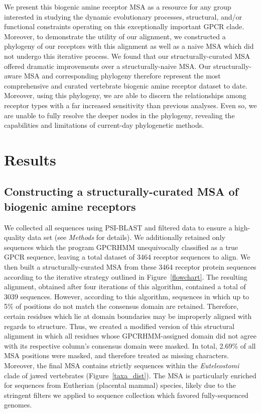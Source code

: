 \documentclass[fleqn,10pt]{wlpeerj}
\begin{document}
We present this biogenic amine receptor MSA as a resource for any group interested in studying the dynamic evolutionary processes, structural, and/or functional constraints operating on this exceptionally important GPCR clade. Moreover, to demonstrate the utility of our alignment, we constructed a phylogeny of our receptors with this alignment as well as a naive MSA which did not undergo this iterative process. We found that our structurally-curated MSA offered dramatic improvements over a structurally-naive MSA. Our structurally-aware MSA and corresponding phylogeny therefore represent the most comprehensive and curated vertebrate biogenic amine receptor dataset to date. Moreover, using this phylogeny, we are able to discern the relationships among receptor types with a far increased sensitivity than previous analyses. Even so, we are unable to fully resolve the deeper nodes in the phylogeny, revealing the capabilities and limitations of current-day phylogenetic methods.

\section*{Results}

\subsection*{Constructing a structurally-curated MSA of biogenic amine receptors}
We collected all sequences using PSI-BLAST and filtered data to ensure a high-quality data set (see \emph{Methods} for details). We additionally retained only sequences which the program GPCRHMM unequivocally classified as a true GPCR sequence, leaving a total dataset of 3464 receptor sequences to align. We then built a structurally-curated MSA from these 3464 receptor protein sequences according to the iterative strategy outlined in Figure~\ref{flowchart}. The resulting alignment, obtained after four iterations of this algorithm, contained a total of 3039 sequences. However, according to this algorithm, sequences in which up to 5\% of positions do not match the consensus domain are retained. Therefore, certain residues which lie at domain boundaries may be improperly aligned with regards to structure. Thus, we created a modified version of this structural alignment in which all residues whose GPCRHMM-assigned domain did not agree with its respective column's consensus domain were masked. In total, 2.69\% of all MSA positions were masked, and therefore treated as missing characters. Moreover, the final MSA contains strictly sequences within the  \emph{Euteleostomi} clade of jawed vertebrates (Figure~\ref{taxa_dist}). The MSA is particularly enriched for sequences from Eutherian (placental mammal) species, likely due to the stringent filters we applied to sequence collection which favored fully-sequenced genomes.  
\end{document}
